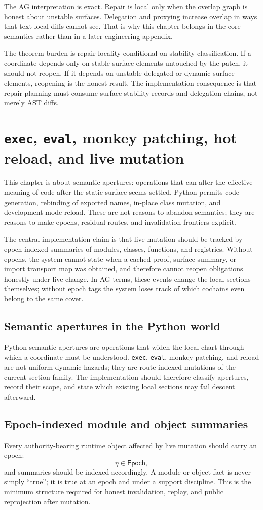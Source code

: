 \documentclass[11pt]{report}
\begin{document}
The AG interpretation is exact. Repair is local only when the overlap graph is honest about unstable surfaces. Delegation and proxying increase overlap in ways that text-local diffs cannot see. That is why this chapter belongs in the core semantics rather than in a later engineering appendix.

The theorem burden is repair-locality conditional on stability classification. If a coordinate depends only on stable surface elements untouched by the patch, it should not reopen. If it depends on unstable delegated or dynamic surface elements, reopening is the honest result. The implementation consequence is that repair planning must consume surface-stability records and delegation chains, not merely AST diffs.
\chapter{\texttt{exec}, \texttt{eval}, monkey patching, hot reload, and live mutation}
This chapter is about semantic apertures: operations that can alter the effective meaning of code after the static surface seems settled. Python permits code generation, rebinding of exported names, in-place class mutation, and development-mode reload. These are not reasons to abandon semantics; they are reasons to make epochs, residual routes, and invalidation frontiers explicit.

The central implementation claim is that live mutation should be tracked by epoch-indexed summaries of modules, classes, functions, and registries. Without epochs, the system cannot state when a cached proof, surface summary, or import transport map was obtained, and therefore cannot reopen obligations honestly under live change. In AG terms, these events change the local sections themselves; without epoch tags the system loses track of which cochains even belong to the same cover.
\section{Semantic apertures in the Python world}
Python semantic apertures are operations that widen the local chart through which a coordinate must be understood. \texttt{exec}, \texttt{eval}, monkey patching, and reload are not uniform dynamic hazards; they are route-indexed mutations of the current section family. The implementation should therefore classify apertures, record their scope, and state which existing local sections may fail descent afterward.
\section{Epoch-indexed module and object summaries}
Every authority-bearing runtime object affected by live mutation should carry an epoch:
\[
\eta \in \mathsf{Epoch},
\]
and summaries should be indexed accordingly. A module or object fact is never simply ``true''; it is true at an epoch and under a support discipline. This is the minimum structure required for honest invalidation, replay, and public reprojection after mutation.
\end{document}
